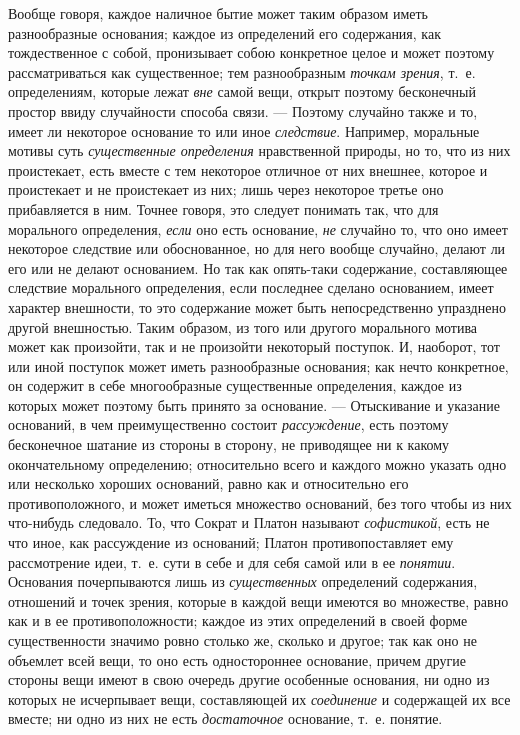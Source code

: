 Вообще говоря, каждое наличное бытие может таким образом иметь разнообразные
основания; каждое из определений его содержания, как тождественное с собой,
пронизывает собою конкретное целое и может поэтому рассматриваться как
существенное; тем разнообразным {\em точкам зрения},
т.~е. определениям, которые лежат {\em вне }самой вещи,
открыт поэтому бесконечный простор ввиду случайности способа связи. —
Поэтому случайно также и то, имеет ли некоторое основание то или иное
{\em следствие}. Например, моральные мотивы суть
{\em существенные определения} нравственной природы, но
то, что из них проистекает, есть вместе с тем некоторое отличное от них
внешнее, которое и проистекает и не проистекает из них; лишь через
некоторое третье оно прибавляется в ним. Точнее говоря, это следует
понимать так, что для морального определения,
{\em если} оно есть основание,
{\em не} случайно то, что оно имеет некоторое следствие
или обоснованное, но для него вообще случайно, делают ли его или не делают
основанием. Но так как опять-таки содержание, составляющее следствие
морального определения, если последнее сделано основанием, имеет характер
внешности, то это содержание может быть непосредственно упразднено другой
внешностью. Таким образом, из того или другого морального мотива может как
произойти, так и не произойти некоторый поступок. И, наоборот, тот или иной
поступок может иметь разнообразные основания; как нечто конкретное, он
содержит в себе многообразные существенные определения, каждое из которых
может поэтому быть принято за основание. — Отыскивание и указание
оснований, в чем преимущественно состоит
{\em рассуждение}, есть поэтому бесконечное шатание из
стороны в сторону, не приводящее ни к какому окончательному определению;
относительно всего и каждого можно указать одно или несколько хороших
оснований, равно как и относительно его противоположного, и может иметься
множество оснований, без того чтобы из них что-нибудь следовало. То, что
Сократ и Платон называют {\em софистикой}, есть не что
иное, как рассуждение из оснований; Платон противопоставляет ему
рассмотрение идеи, т.~е. сути в себе и для себя самой или в ее
{\em понятии}. Основания почерпываются лишь из
{\em существенных} определений содержания, отношений и
точек зрения, которые в каждой вещи имеются во множестве, равно как и в ее
противоположности; каждое из этих определений в своей форме существенности
значимо ровно столько же, сколько и другое; так как оно не объемлет всей
вещи, то оно есть одностороннее основание, причем другие стороны вещи имеют
в свою очередь другие особенные основания, ни одно из которых не
исчерпывает вещи, составляющей их {\em соединение} и
содержащей их все вместе; ни одно из них не есть
{\em достаточное} основание, т.~е. понятие.

